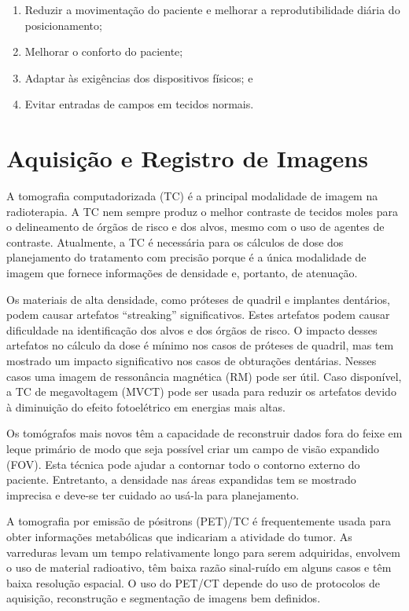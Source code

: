 \documentclass[11pt,a4paper]{article}
\begin{document}
	\begin{enumerate}[label=\textcolor{CarnationPink}{(\roman*)}]
		\item Reduzir a movimentação do paciente e melhorar a reprodutibilidade diária do posicionamento;
		\item Melhorar o conforto do paciente;
		\item Adaptar às exigências dos dispositivos físicos; e
		\item Evitar entradas de campos em tecidos normais.
	\end{enumerate}

\section{Aquisição e Registro de Imagens}

	A tomografia computadorizada (TC) é a principal modalidade de imagem na radioterapia. A TC nem sempre produz o melhor contraste de tecidos moles para o delineamento de órgãos de risco e dos alvos, mesmo com o uso de agentes de contraste. Atualmente, a TC é necessária para os cálculos de dose dos planejamento do tratamento com precisão porque é a única modalidade de imagem que fornece informações de densidade e, portanto, de atenuação.
	
	Os materiais de alta densidade, como próteses de quadril e implantes dentários, podem causar artefatos ``streaking'' significativos. Estes artefatos podem causar dificuldade na identificação dos alvos e dos órgãos de risco. O impacto desses artefatos no cálculo da dose é mínimo nos casos de próteses de quadril, mas tem mostrado um impacto significativo nos casos de obturações dentárias. Nesses casos uma imagem de ressonância magnética (RM) pode ser útil. Caso disponível, a TC de megavoltagem (MVCT) pode ser usada para reduzir os artefatos devido à diminuição do efeito fotoelétrico em energias mais altas.
	
	Os tomógrafos mais novos têm a capacidade de reconstruir dados fora do feixe em leque primário de modo que seja possível criar um campo de visão expandido (FOV). Esta técnica pode ajudar a contornar todo o contorno externo do paciente. Entretanto, a densidade nas áreas expandidas tem se mostrado imprecisa e deve-se ter cuidado ao usá-la para planejamento.

	A tomografia por emissão de pósitrons (PET)/TC é frequentemente usada para obter informações metabólicas que indicariam a atividade do tumor. As varreduras levam um tempo relativamente longo para serem adquiridas, envolvem o uso de material radioativo, têm baixa razão sinal-ruído em alguns casos e têm baixa resolução espacial. O uso do PET/CT depende do uso de protocolos de aquisição, reconstrução e segmentação de imagens bem definidos.
\end{document}
